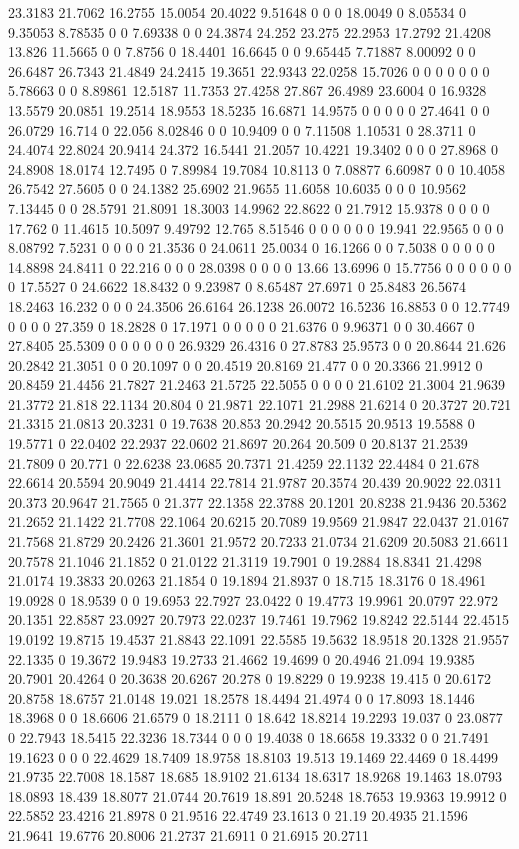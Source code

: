 23.3183 21.7062 16.2755 15.0054 20.4022 9.51648 0 0 0 18.0049 0 8.05534 0 9.35053 8.78535 0 0 7.69338 0 0 24.3874 24.252 23.275 22.2953 17.2792 21.4208 13.826 11.5665 0 0 7.8756 0 18.4401 16.6645 0 0 9.65445 7.71887 8.00092 0 0 26.6487 26.7343 21.4849 24.2415 19.3651 22.9343 22.0258 15.7026 0 0 0 0 0 0 0 5.78663 0 0 8.89861 12.5187 11.7353 27.4258 27.867 26.4989 23.6004 0 16.9328 13.5579 20.0851 19.2514 18.9553 18.5235 16.6871 14.9575 0 0 0 0 0 27.4641 0 0 26.0729 16.714 0 22.056 8.02846 0 0 10.9409 0 0 7.11508 1.10531 0 28.3711 0 24.4074 22.8024 20.9414 24.372 16.5441 21.2057 10.4221 19.3402 0 0 0 27.8968 0 24.8908 18.0174 12.7495 0 7.89984 19.7084 10.8113 0 7.08877 6.60987 0 0 10.4058 26.7542 27.5605 0 0 24.1382 25.6902 21.9655 11.6058 10.6035 0 0 0 10.9562 7.13445 0 0 28.5791 21.8091 18.3003 14.9962 22.8622 0 21.7912 15.9378 0 0 0 0 17.762 0 11.4615 10.5097 9.49792 12.765 8.51546 0 0 0 0 0 0 19.941 22.9565 0 0 0 8.08792 7.5231 0 0 0 0 21.3536 0 24.0611 25.0034 0 16.1266 0 0 7.5038 0 0 0 0 0 14.8898 24.8411 0 22.216 0 0 0 28.0398 0 0 0 0 13.66 13.6996 0 15.7756 0 0 0 0 0 0 0 17.5527 0 24.6622 18.8432 0 9.23987 0 8.65487 27.6971 0 25.8483 26.5674 18.2463 16.232 0 0 0 24.3506 26.6164 26.1238 26.0072 16.5236 16.8853 0 0 12.7749 0 0 0 0 27.359 0 18.2828 0 17.1971 0 0 0 0 0 21.6376 0 9.96371 0 0 30.4667 0 27.8405 25.5309 0 0 0 0 0 0 26.9329 26.4316 0 27.8783 25.9573 0 0 20.8644 21.626 20.2842 21.3051 0 0 20.1097 0 0 20.4519 20.8169 21.477 0 0 20.3366 21.9912 0 20.8459 21.4456 21.7827 21.2463 21.5725 22.5055 0 0 0 0 21.6102 21.3004 21.9639 21.3772 21.818 22.1134 20.804 0 21.9871 22.1071 21.2988 21.6214 0 20.3727 20.721 21.3315 21.0813 20.3231 0 19.7638 20.853 20.2942 20.5515 20.9513 19.5588 0 19.5771 0 22.0402 22.2937 22.0602 21.8697 20.264 20.509 0 20.8137 21.2539 21.7809 0 20.771 0 22.6238 23.0685 20.7371 21.4259 22.1132 22.4484 0 21.678 22.6614 20.5594 20.9049 21.4414 22.7814 21.9787 20.3574 20.439 20.9022 22.0311 20.373 20.9647 21.7565 0 21.377 22.1358 22.3788 20.1201 20.8238 21.9436 20.5362 21.2652 21.1422 21.7708 22.1064 20.6215 20.7089 19.9569 21.9847 22.0437 21.0167 21.7568 21.8729 20.2426 21.3601 21.9572 20.7233 21.0734 21.6209 20.5083 21.6611 20.7578 21.1046 21.1852 0 21.0122 21.3119 19.7901 0 19.2884 18.8341 21.4298 21.0174 19.3833 20.0263 21.1854 0 19.1894 21.8937 0 18.715 18.3176 0 18.4961 19.0928 0 18.9539 0 0 19.6953 22.7927 23.0422 0 19.4773 19.9961 20.0797 22.972 20.1351 22.8587 23.0927 20.7973 22.0237 19.7461 19.7962 19.8242 22.5144 22.4515 19.0192 19.8715 19.4537 21.8843 22.1091 22.5585 19.5632 18.9518 20.1328 21.9557 22.1335 0 19.3672 19.9483 19.2733 21.4662 19.4699 0 20.4946 21.094 19.9385 20.7901 20.4264 0 20.3638 20.6267 20.278 0 19.8229 0 19.9238 19.415 0 20.6172 20.8758 18.6757 21.0148 19.021 18.2578 18.4494 21.4974 0 0 17.8093 18.1446 18.3968 0 0 18.6606 21.6579 0 18.2111 0 18.642 18.8214 19.2293 19.037 0 23.0877 0 22.7943 18.5415 22.3236 18.7344 0 0 0 19.4038 0 18.6658 19.3332 0 0 21.7491 19.1623 0 0 0 22.4629 18.7409 18.9758 18.8103 19.513 19.1469 22.4469 0 18.4499 21.9735 22.7008 18.1587 18.685 18.9102 21.6134 18.6317 18.9268 19.1463 18.0793 18.0893 18.439 18.8077 21.0744 20.7619 18.891 20.5248 18.7653 19.9363 19.9912 0 22.5852 23.4216 21.8978 0 21.9516 22.4749 23.1613 0 21.19 20.4935 21.1596 21.9641 19.6776 20.8006 21.2737 21.6911 0 21.6915 20.2711 